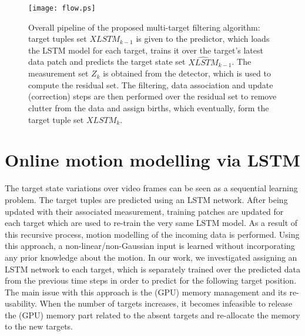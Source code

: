 \documentclass[runningheads]{llncs}
\begin{document}
\begin{figure*}[t]
\centering
\texttt{[image: flow.ps]}
\caption{Overall pipeline of the proposed multi-target filtering algorithm: target tuples set $XLSTM_{k-1}$ is given to the predictor, which loads the LSTM model for each target, trains it over the target's latest data patch and predicts the target state set $\hat{XLSTM}_{k-1}$. The measurement set $Z_k$ is obtained from the detector, which is used to compute the residual set. The filtering, data association and update (correction) steps are then performed over the residual set to remove clutter from the data and assign births, which eventually, form the target tuple set $XLSTM_k$.}
\label{fig:overall}
\end{figure*}

\section{Online motion modelling via LSTM}\label{sec:lstmMerge}


The target state variations over video frames can be seen as a sequential learning problem.
The target tuples are predicted using an LSTM network. After being updated with their associated measurement, training patches are updated for each target which are used to re-train the very same LSTM model. As a result of this recursive process, motion modelling of the incoming data is performed. Using this approach, a non-linear/non-Gaussian input is learned without incorporating any prior knowledge about the motion. 
In our work, we investigated assigning an LSTM network to each target, which is separately trained over the predicted data from the previous time steps in order to predict for the following target position. The main issue with this approach is the (GPU) memory management and its re-usability. When the number of targets increases, it becomes infeasible to release the (GPU) memory part related to the absent targets and re-allocate the memory to the new targets.
\end{document}
